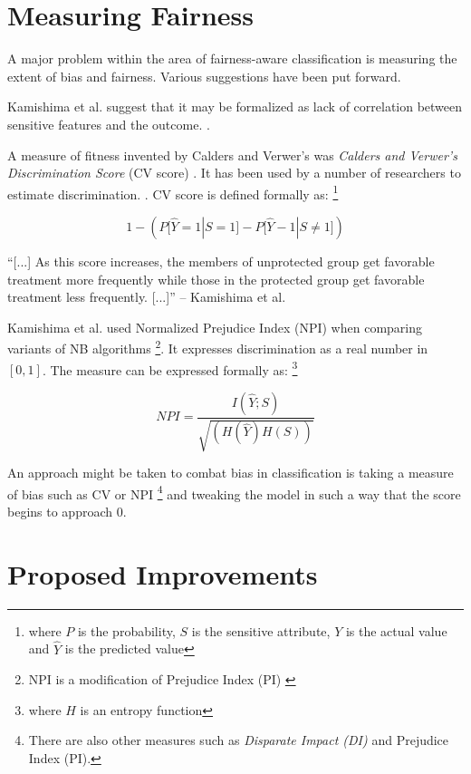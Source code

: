 \documentclass[a4paper, 12pt, notitlepage]{article}
\begin{document}
\section*{Measuring Fairness}

A major problem within the area of fairness-aware classification is measuring the extent of bias and fairness. \cite[p.281]{calders2010} Various suggestions have been put forward. \par

Kamishima et al. suggest that it may be formalized as lack of correlation between sensitive features and the outcome. \cite[p.~259]{kamishima2018}.  \par

A measure of fitness invented by Calders and Verwer's was \emph{Calders and Verwer's Discrimination Score} (CV score) \cite[p.~281]{calders2010}. It has been used by a number of researchers to estimate discrimination.  \cite[p.~44]{kamishima2012b} \cite[p.~381]{kamishima2012a}. CV score is defined formally as: \footnote{where $P$ is the probability, $S$ is the sensitive attribute, $Y$ is the actual value and $\hat{Y}$ is the predicted value}

\[
  1 - (P\big[ \hat{Y} = 1 | S = 1\big] - P \big[ \hat{Y} - 1 | S \neq 1 \big])
\] 

``[...] As this score increases, the members of unprotected group get favorable treatment more frequently while those in the protected group get favorable treatment less frequently. [...]'' -- Kamishima et al. \cite[p~.852]{kamishima2013} \par

Kamishima et al. used Normalized Prejudice Index (NPI) when comparing variants of NB algorithms \footnote{NPI is a modification of Prejudice Index (PI) \cite{kamishima2012b}}.  It expresses discrimination as a real number in $[0,1]$.  The measure can be expressed formally as: \footnote{where $H$ is an entropy function}

\[
  NPI = \frac{I(\hat{Y}; S)}{\sqrt{(H(\hat{Y})H(S))}}
\] \par

An approach might be taken to combat bias in classification is taking a measure of bias such as CV or NPI \footnote{There are also other measures such as \emph{Disparate Impact (DI)} and Prejudice Index (PI).} and tweaking the model in such a way that the score begins to approach 0. 

\section*{Proposed Improvements}
\end{document}
